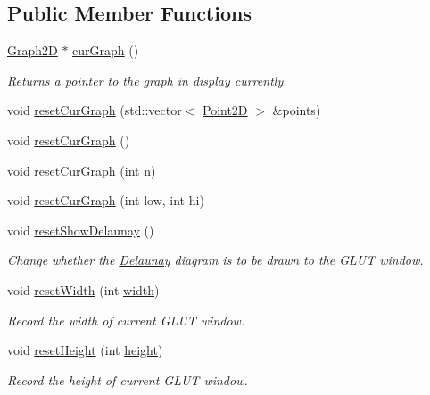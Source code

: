 \subsection*{Public Member Functions}
\begin{DoxyCompactItemize}
\item 
\hyperlink{classcmst_1_1_graph2_d}{Graph2D} $\ast$ \hyperlink{classcmst_1_1_window_a83548b1c4406f37a812a0920fc4d6669}{curGraph} ()
\begin{DoxyCompactList}\small\item\em Returns a pointer to the graph in display currently. \end{DoxyCompactList}\item 
void \hyperlink{classcmst_1_1_window_adfa83ea52f2c09def65b79cdf57092ad}{resetCurGraph} (std::vector$<$ \hyperlink{classcmst_1_1_point2_d}{Point2D} $>$ \&points)
\item 
void \hyperlink{classcmst_1_1_window_a08365866ac2ffa9793c25c92750341e2}{resetCurGraph} ()
\item 
void \hyperlink{classcmst_1_1_window_a83743944c1c6429f0eb9f3c72c9b7f22}{resetCurGraph} (int n)
\item 
void \hyperlink{classcmst_1_1_window_aa4ad17303edd88d526b66f9e6918fe7a}{resetCurGraph} (int low, int hi)
\item 
void \hyperlink{classcmst_1_1_window_ae54c419d28bd352f52a3beffa6fc1f32}{resetShowDelaunay} ()
\begin{DoxyCompactList}\small\item\em Change whether the \hyperlink{class_delaunay}{Delaunay} diagram is to be drawn to the GLUT window. \end{DoxyCompactList}\item 
void \hyperlink{classcmst_1_1_window_a3f234daf3198e3611892515f1721de44}{resetWidth} (int \hyperlink{classcmst_1_1_window_a5fc4ccbd9afed56cd17d341269028da2}{width})
\begin{DoxyCompactList}\small\item\em Record the width of current GLUT window. \end{DoxyCompactList}\item 
void \hyperlink{classcmst_1_1_window_a8c4d7788d1932e73397c20b7a9639d69}{resetHeight} (int \hyperlink{classcmst_1_1_window_a6fc02b2afee52c0f71b6a3bd39c9210f}{height})
\begin{DoxyCompactList}\small\item\em Record the height of current GLUT window. \end{DoxyCompactList}\item 

\end{DoxyCompactItemize}
